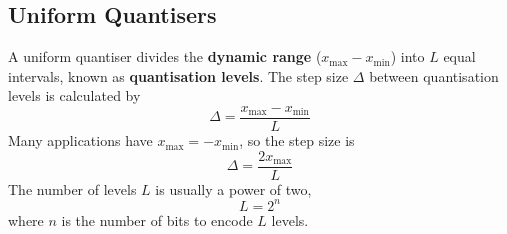 \documentclass{article}
\begin{document}
\subsection{Uniform Quantisers}
A uniform quantiser divides the \textbf{dynamic range}
(\(x_\mathrm{max} - x_\mathrm{min}\)) into \(L\) equal intervals, known
as \textbf{quantisation levels}. The step size \(\Delta\) between
quantisation levels is calculated by
\begin{equation*}
    \Delta = \frac{x_\mathrm{max} - x_\mathrm{min}}{L}
\end{equation*}
Many applications have \(x_\mathrm{max} = -x_\mathrm{min}\), so the step size is
\begin{equation*}
    \Delta = \frac{2 x_\mathrm{max}}{L}
\end{equation*}
The number of levels \(L\) is usually a power of two,
\begin{equation*}
    L = 2^n
\end{equation*}
where \(n\) is the number of bits to encode \(L\) levels.
\end{document}
